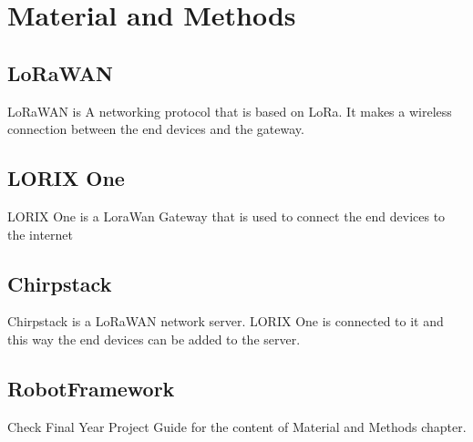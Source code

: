 
\chapter{Material and Methods}
\section{LoRaWAN}
LoRaWAN is A networking protocol that is based on LoRa. It makes a wireless connection between the end devices and the gateway.
\section{LORIX One}
LORIX One is a LoraWan Gateway that is used to connect the end devices to the internet
\section{Chirpstack}
    Chirpstack is a LoRaWAN network server. LORIX One is connected to it and this way the end devices can be added to the server.
\section{RobotFramework}



Check Final Year Project Guide for the content of Material and Methods chapter.

\clearpage %
